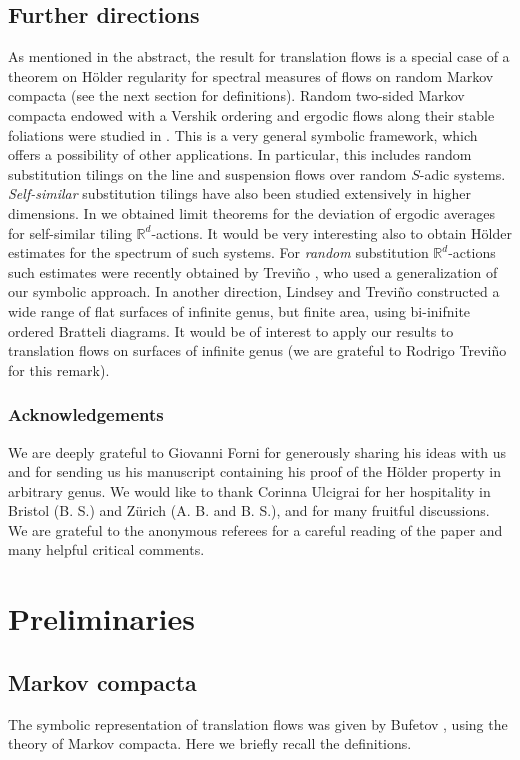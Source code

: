\documentclass[JEP,XML,SOM,Unicode]{cedram}
\theoremstyle{plain}
\theoremstyle{definition}
\newcommand{\R}{\mathbb{R}}
\begin{document}
\subsection{Further directions} As mentioned in the abstract, the result for translation flows is a special case of a theorem on Hölder regularity for spectral measures of flows on random Markov compacta (see the next section for definitions).
Random two-sided Markov compacta endowed with a Vershik ordering and ergodic flows along their stable foliations were studied in \cite{Buf-umn}.
This is a very general symbolic framework, which offers a possibility of other applications. In particular, this includes random substitution tilings on the line and suspension flows over random $S$-adic systems.
\emph{Self-similar} substitution tilings have also been studied extensively in higher dimensions. In \cite{BuSol--limit} we obtained limit theorems for the deviation of ergodic averages for self-similar tiling $\R^d$-actions. It would be very interesting also to obtain Hölder estimates for the spectrum of such systems. For \emph{random} substitution $\R^d$-actions such estimates were recently obtained by
Trevi\~no \cite{Tre_prepint}, who used a generalization of our symbolic approach. In another direction,
Lindsey and Trevi\~no \cite{LinTre} constructed a wide range of flat surfaces of infinite genus, but finite area, using bi-inifnite ordered Bratteli diagrams. It would be of interest to apply our results to translation flows on surfaces of infinite genus (we are grateful to Rodrigo Trevi\~no for this remark).

\subsubsection*{Acknowledgements} We are deeply grateful to Giovanni Forni for generously sharing his ideas with us and for sending us his manuscript containing his proof of the Hölder property in arbitrary genus. We would like to thank Corinna Ulcigrai for her hospitality in Bristol (B. S.) and Zürich (A. B. and B. S.), and for many fruitful discussions. We are grateful to the anonymous referees for a careful reading of the paper and many helpful critical comments.

\section{Preliminaries}

\subsection{Markov compacta}\label{subsec:2.1}
The symbolic representation of translation flows was given by Bufetov \cite{Buf-umn}, using the theory of Markov compacta. Here we briefly recall the definitions.
\end{document}
